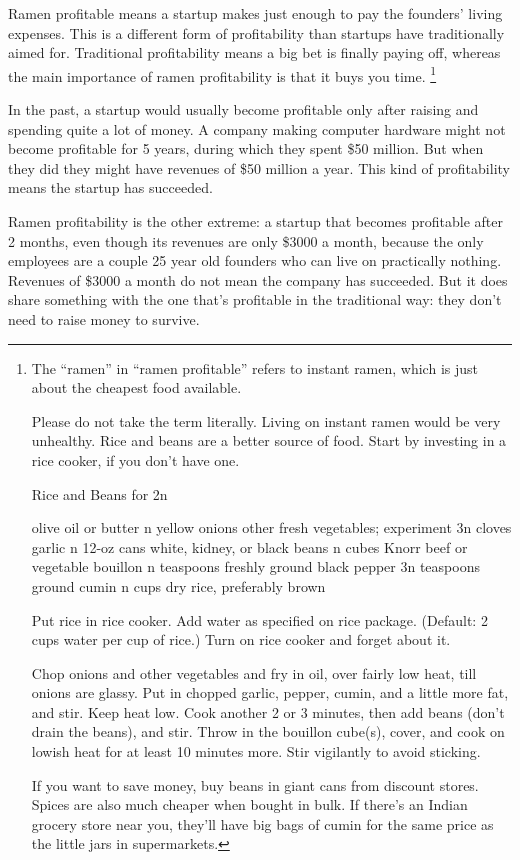 \documentclass[12pt]{book}
\begin{document}
Ramen profitable means a startup makes just enough to pay the founders'
living expenses. This is a different form of profitability than startups
have traditionally aimed for. Traditional profitability means a big bet
is finally paying off, whereas the main importance of ramen
profitability is that it buys you time. \footnote{The ``ramen'' in ``ramen profitable'' refers to instant ramen,
which is just about the cheapest food available.

Please do not take the term literally. Living on instant ramen would be
very unhealthy. Rice and beans are a better source of food. Start by
investing in a rice cooker, if you don't have one.

Rice and Beans for 2n

olive oil or butter n yellow onions other fresh vegetables; experiment
3n cloves garlic n 12-oz cans white, kidney, or black beans n cubes
Knorr beef or vegetable bouillon n teaspoons freshly ground black pepper
3n teaspoons ground cumin n cups dry rice, preferably brown

Put rice in rice cooker. Add water as specified on rice package.
(Default: 2 cups water per cup of rice.) Turn on rice cooker and forget
about it.

Chop onions and other vegetables and fry in oil, over fairly low heat,
till onions are glassy. Put in chopped garlic, pepper, cumin, and a
little more fat, and stir. Keep heat low. Cook another 2 or 3 minutes,
then add beans (don't drain the beans), and stir. Throw in the bouillon
cube(s), cover, and cook on lowish heat for at least 10 minutes more.
Stir vigilantly to avoid sticking.

If you want to save money, buy beans in giant cans from discount stores.
Spices are also much cheaper when bought in bulk. If there's an Indian
grocery store near you, they'll have big bags of cumin for the same
price as the little jars in supermarkets.}

In the past, a startup would usually become profitable only after
raising and spending quite a lot of money. A company making computer
hardware might not become profitable for 5 years, during which they
spent \$50 million. But when they did they might have revenues of \$50
million a year. This kind of profitability means the startup has
succeeded.

Ramen profitability is the other extreme: a startup that becomes
profitable after 2 months, even though its revenues are only \$3000 a
month, because the only employees are a couple 25 year old founders who
can live on practically nothing. Revenues of \$3000 a month do not mean
the company has succeeded. But it does share something with the one
that's profitable in the traditional way: they don't need to raise money
to survive.
\end{document}
